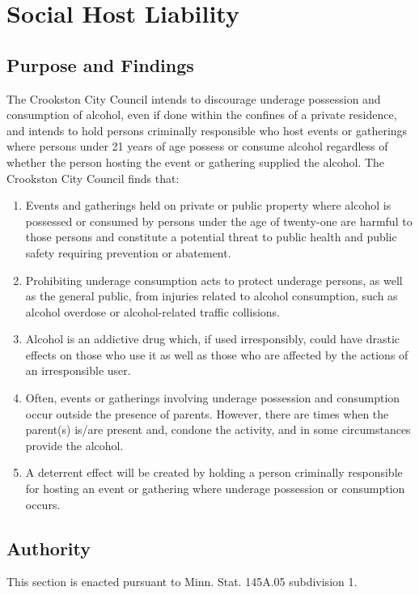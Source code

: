 \section{Social Host Liability}
\subsection{Purpose and Findings}
The Crookston City Council intends to discourage underage possession and consumption of alcohol, even if done within the confines of a private residence, and intends to hold persons criminally responsible who host events or gatherings where persons under 21 years of age possess or consume alcohol regardless of whether the person hosting the event or gathering supplied the alcohol. The Crookston City Council finds that:
\begin{enumerate}[{\indent}1)]
    \item Events and gatherings held on private or public property where alcohol is possessed or consumed by persons under the age of twenty-one are harmful to those persons and constitute a potential threat to public health and public safety requiring prevention or abatement.
    \item Prohibiting underage consumption acts to protect underage persons, as well as the general public, from injuries related to alcohol consumption, such as alcohol overdose or alcohol-related traffic collisions.
    \item Alcohol is an addictive drug which, if used irresponsibly, could have drastic effects on those who use it as well as those who are affected by the actions of an irresponsible user.
    \item Often, events or gatherings involving underage possession and consumption occur outside the presence of parents. However, there are times when the parent(s) is/are present and, condone the activity, and in some circumstances provide the alcohol.
    \item A deterrent effect will be created by holding a person criminally responsible for hosting an event or gathering where underage possession or consumption occurs.
\end{enumerate}
\subsection{Authority}
This section is enacted pursuant to Minn. Stat. \textsection 145A.05 subdivision 1.
